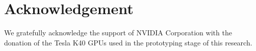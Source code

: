 \documentclass[10pt,twocolumn,letterpaper]{article}
\begin{document}






\section*{Acknowledgement}
We gratefully acknowledge the support of NVIDIA Corporation with the donation of the Tesla K40 GPUs used in the prototyping stage of this research.

{\small


}
\end{document}
